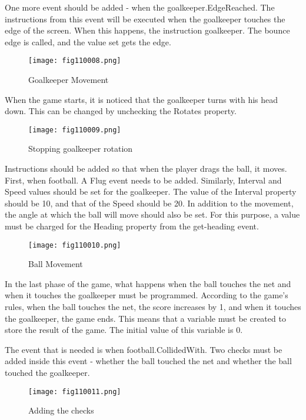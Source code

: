 One more event should be added - when the goalkeeper.EdgeReached. The instructions from this event will be executed when the goalkeeper touches the edge of the screen. When this happens, the instruction goalkeeper. The bounce edge is called, and the value set gets the edge.

\begin{figure}[H]
   \centering
   \texttt{[image: fig110008.png]}
   \caption{Goalkeeper Movement}
\label{fig110008}
\end{figure}

When the game starts, it is noticed that the goalkeeper turns with his head down. This can be changed by unchecking the Rotates property.

\begin{figure}[H]
   \centering
   \texttt{[image: fig110009.png]}
   \caption{Stopping goalkeeper rotation}
\label{fig110009}
\end{figure}

Instructions should be added so that when the player drags the ball, it moves. First, when football. A Flug event needs to be added. Similarly, Interval and Speed values should be set for the goalkeeper. The value of the Interval property should be 10, and that of the Speed should be 20. In addition to the movement, the angle at which the ball will move should also be set. For this purpose, a value must be charged for the Heading property from the get-heading event.

\begin{figure}[H]
   \centering
   \texttt{[image: fig110010.png]}
   \caption{Ball Movement}
\label{fig110010}
\end{figure}

In the last phase of the game, what happens when the ball touches the net and when it touches the goalkeeper must be programmed. According to the game's rules, when the ball touches the net, the score increases by 1, and when it touches the goalkeeper, the game ends. This means that a variable must be created to store the result of the game. The initial value of this variable is 0.

The event that is needed is when football.CollidedWith. Two checks must be added inside this event - whether the ball touched the net and whether the ball touched the goalkeeper.

\begin{figure}[H]
   \centering
   \texttt{[image: fig110011.png]}
   \caption{Adding the checks}
\label{fig110011}
\end{figure}

